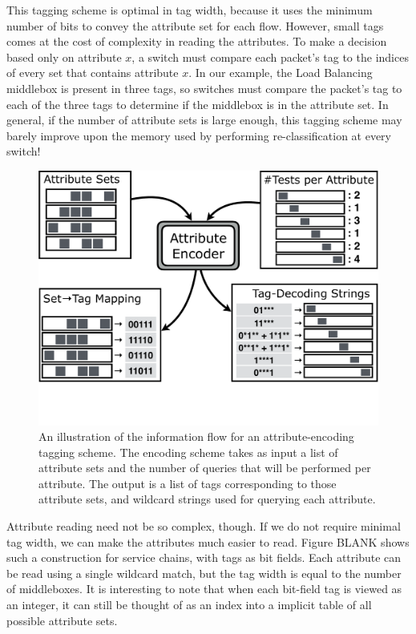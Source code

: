 This tagging scheme is optimal in tag width, because it uses the minimum number of bits to convey the attribute set for each flow. However, small tags comes at the cost of complexity in reading the attributes.  To make a decision based only on attribute $x$, a switch must compare each packet's tag to the indices of every set that contains attribute $x$. In our example, the Load Balancing middlebox is present in three tags, so switches must compare the packet's tag to each of the three tags to determine if the middlebox is in the attribute set. In general, if the number of attribute sets is large enough, this tagging scheme may barely improve upon the memory used by performing re-classification at every switch!




\begin{figure}[t!] 
\begin{minipage}{1\linewidth}
\includegraphics[trim={0 4cm 0 0}, clip, width=\linewidth]{figures/system_flow2}
\end{minipage} 
\caption{An illustration of the information flow for an attribute-encoding tagging scheme. The encoding scheme takes as input a list of attribute sets and the number of queries that will be performed per attribute. The output is a list of tags corresponding to those attribute sets, and wildcard strings used for querying each attribute.}
\label{fig:system_flow}
\end{figure}

Attribute reading need not be so complex, though. If we do not require minimal tag width, we can make the attributes much easier to read. Figure BLANK shows such a construction for service chains, with tags as bit fields. Each attribute can be read using a single wildcard match, but the tag width is equal to the number of middleboxes. It is interesting to note that when each bit-field tag is viewed as an integer, it can still be thought of as an index into a implicit table of all possible attribute sets. 


